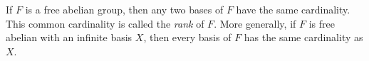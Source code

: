 If $F$ is a free abelian group, then any two bases of $F$ have the same cardinality. This common cardinality is called the \emph{rank} of $F$. More generally, if $F$ is free abelian with an infinite basis $X$, then every basis of $F$ has the same cardinality as $X$.
